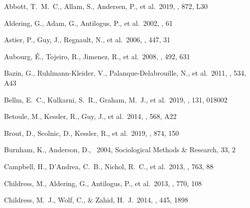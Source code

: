\documentclass[]{aa} %
\begin{document}
\begin{thebibliography}{} 

 Abbott, T.~M.~C., Allam, S., Andersen, P., et al.\ 2019, \apjl, 872, L30

 Aldering, G., Adam, G., Antilogus, P., et al.\ 2002, \procspie, 61

 Astier, P., Guy, J., Regnault, N., et al.\ 2006, \aap, 447, 31



 Aubourg, {\'E}.,
  Tojeiro, R., Jimenez, R., et al.\ 2008, \aap, 492, 631 


 Bazin, G., Ruhlmann-Kleider, V., Palanque-Delabrouille, N., et al.\ 2011, \aap, 534, A43

 Bellm, E.~C., Kulkarni, S.~R., Graham, M.~J., et al.\ 2019, \pasp, 131, 018002

 Betoule, M., Kessler, R., Guy, J., et al.\ 2014, \aap, 568, A22

 Brout, D., Scolnic, D., Kessler, R., et al.\ 2019, \apj, 874, 150

 Burnham, K., Anderson, D., \
2004, Sociological Methods \& Research, 33, 2

 Campbell, H., D'Andrea, C.~B., Nichol, R.~C., et al.\ 2013, \apj, 763, 88



 Childress, M., Aldering, G., Antilogus, P., et al.\ 2013, \apj, 770, 108

 Childress, M.~J., Wolf, C., \& Zahid, H.~J.\ 2014, \mnras, 445, 1898




\end{thebibliography}
\end{document}
